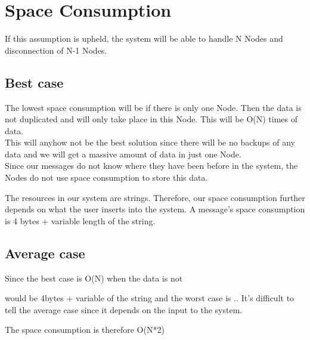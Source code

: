 \section{Space Consumption}
If this assumption is upheld, the system will be able to handle N Nodes and disconnection of N-1 Nodes.

\subsection{Best case}
The lowest space consumption will be if there is only one Node. Then the data is not duplicated and will only take place in this Node. This will be O(N) times of data. \\ This will anyhow not be the best solution since there will be no backups of any data and we will get a massive amount of data in just one Node. \\ 
Since our messages do not know where they have been before in the system, the Nodes do not use space consumption to store this data. 

The resources in our system are strings. Therefore, our space consumption further depends on what the user inserts into the system. A message's space consumption is 4 bytes + variable length of the string. 

\subsection{Average case}
Since the best case is O(N) when the data is not 

would be 4bytes + variable of the string and the worst case is .. 
It's difficult to tell the average case since it depends on the input to the system. 

The space consumption is therefore O(N*2)

